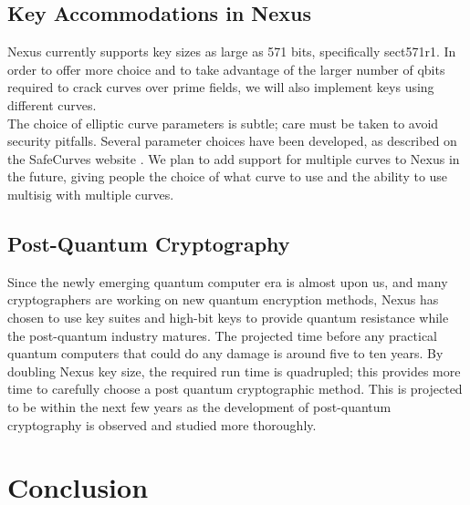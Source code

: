 \documentclass[11pt]{article}
\begin{document}
\subsection{Key Accommodations in Nexus} 

Nexus currently supports key sizes as large as 571 bits, specifically sect571r1.
In order to offer more choice and to take advantage of the larger number of qbits required to crack curves over prime fields, we will also implement keys using different curves.\\

\noindent The choice of elliptic curve parameters is subtle; care must be taken to avoid security pitfalls.
Several parameter choices have been developed, as described on the SafeCurves website \cite{safecurves}.
We plan to add support for multiple curves to Nexus in the future, giving people the choice of what curve to use and the ability to use multisig with multiple curves.

\subsection{Post-Quantum Cryptography}

Since the newly emerging quantum computer era is almost upon us, and many cryptographers are working on new quantum encryption methods, Nexus has chosen to use key suites and high-bit keys to provide quantum resistance while the post-quantum industry matures. 
The projected time before any practical quantum computers that could do any damage is around five to ten years. 
By doubling Nexus key size, the required run time is quadrupled; this provides more time to carefully choose a post quantum cryptographic method. 
This is projected to be within the next few years as the development of post-quantum cryptography is observed and studied more thoroughly.

\section{Conclusion}
\end{document}
